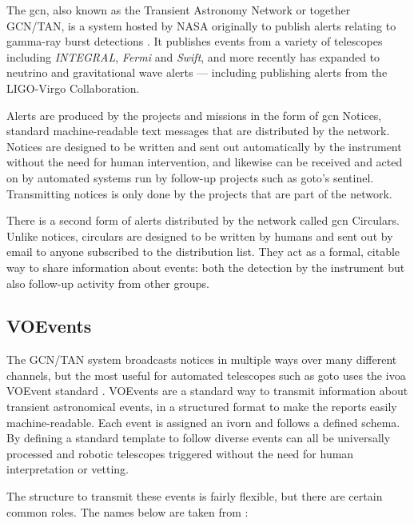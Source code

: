 \begin{colsection}
\begin{colsection}
The \gls{gcn}, also known as the Transient Astronomy Network or together GCN/TAN, is a system hosted by NASA originally to publish alerts relating to gamma-ray burst detections \citep{GCN}. It publishes events from a variety of telescopes including \textit{INTEGRAL}, \textit{Fermi} and \textit{Swift}, and more recently has expanded to neutrino and gravitational wave alerts --- including publishing alerts from the LIGO-Virgo Collaboration.

Alerts are produced by the projects and missions in the form of \gls{gcn} Notices, standard machine-readable text messages that are distributed by the network. Notices are designed to be written and sent out automatically by the instrument without the need for human intervention, and likewise can be received and acted on by automated systems run by follow-up projects such as \gls{goto}'s sentinel. Transmitting notices is only done by the projects that are part of the network.

There is a second form of alerts distributed by the network called \gls{gcn} Circulars. Unlike notices, circulars are designed to be written by humans and sent out by email to anyone subscribed to the distribution list. They act as a formal, citable way to share information about events: both the detection by the instrument but also follow-up activity from other groups.

\end{colsection}


\newpage
\subsection{VOEvents}
\label{sec:voevents}
\begin{colsection}

The GCN/TAN system broadcasts notices in multiple ways over many different channels, but the most useful for automated telescopes such as \gls{goto} uses the \gls{ivoa} VOEvent standard \citep{voevent}. VOEvents are a standard way to transmit information about transient astronomical events, in a structured format to make the reports easily machine-readable. Each event is assigned an \gls{ivorn} and follows a defined schema. By defining a standard template to follow diverse events can all be universally processed and robotic telescopes triggered without the need for human interpretation or vetting.

The structure to transmit these events is fairly flexible, but there are certain common roles. The names below are taken from \citet{voevent}:


\end{colsection}
\end{colsection}
